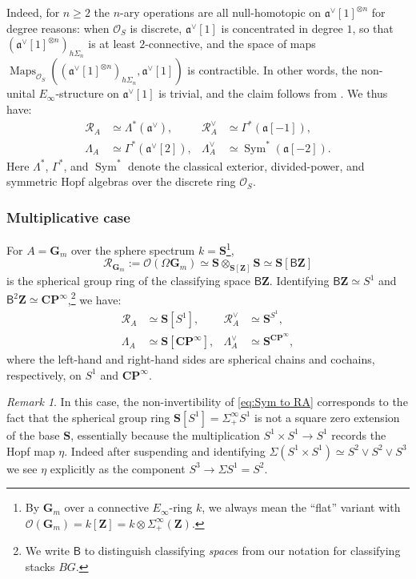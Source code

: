 \documentclass[12pt, oneside]{amsart}
\numberwithin{equation}{section}
\theoremstyle{remark}
\newtheorem{remark}[subsubsection]{Remark}
\theoremstyle{plain}
\renewcommand{\ge}{\geqslant}
\DeclareMathOperator{\Map}{Maps}
\newcommand{\R}{\mathcal{R}}
\newcommand{\RA}{\R_A}
\newcommand{\fra}{\mathfrak{a}}
\newcommand{\frav}{\mathfrak{a}^\vee}
\newcommand{\lam}{\Lambda}
\newcommand{\lamco}{\Lambda^\vee}
\newcommand{\OO}{\mathcal{O}}
\newcommand{\GGm}{\mathbf{G}_{m}}
\newcommand{\bZ}{\mathbf{Z}}
\DeclareMathOperator{\Sym}{Sym}
\begin{document}
Indeed, for $n \ge 2$ the $n$-ary operations are all null-homotopic on $\frav[1]^{\otimes n}$ for degree reasons: when $\OO_S$ is discrete, $\frav[1]$ is concentrated in degree $1$, so that $(\frav[1]^{\otimes n})_{h\Sigma_n}$ is at least $2$-connective, and the space of maps $\Map_{\OO_S}((\frav[1]^{\otimes n})_{h\Sigma_n}, \frav[1])$ is contractible.
In other words, the non-unital $E_\infty$-structure on $\frav[1]$ is trivial, and the claim follows from \cite[Prop.~5.4.4.10]{LurieHA}.
We thus have:
\begin{align*}
  \RA &\simeq \Lambda^*(\frav), & \RA^\vee &\simeq \Gamma^*(\fra[-1]), \\
  \lam_A &\simeq \Gamma^*(\frav[2]), & \lamco_A &\simeq \Sym^*(\fra[-2]).
\end{align*}
Here $\Lambda^*$, $\Gamma^*$, and $\Sym^*$ denote the classical exterior, divided-power, and symmetric Hopf algebras over the discrete ring $\OO_S$.

\subsubsection{Multiplicative case}\label{sssec:OO(Gm[-1])}

For $A = \GGm$ over the sphere spectrum $k=\mathbf{S}$\footnote{%
By $\GGm$ over a connective $E_\infty$-ring $k$, we always mean the ``flat'' variant with $\OO(\GGm) = k[\bZ] = k \otimes \Sigma^\infty_+(\bZ)$.
},
$$\R_{\GGm} := \OO(\Omega\GGm) \simeq \mathbf{S} \otimes_{\mathbf{S}[\bZ]} \mathbf{S} \simeq \mathbf{S}[\mathsf{B}\bZ]$$
is the spherical group ring of the classifying space $\mathsf{B}\bZ$.
Identifying $\mathsf{B}\mathbf{Z} \simeq S^1$ and $\mathsf{B}^2\mathbf{Z} \simeq \mathbf{C}\mathbf{P}^\infty$,\footnote{%
  We write $\mathsf{B}$ to distinguish classifying \emph{space}s from our notation for classifying stacks $BG$.
} we have:
\begin{align*}
  \RA &\simeq \mathbf{S}[S^1], & \RA^\vee &\simeq \mathbf{S}^{S^1}, \\
  \lam_A &\simeq \mathbf{S}[\mathbf{C}\mathbf{P}^\infty], & \lamco_A &\simeq \mathbf{S}^{\mathbf{C}\mathbf{P}^\infty},
\end{align*}
where the left-hand and right-hand sides are spherical chains and cochains, respectively, on $S^1$ and $\mathbf{C}\mathbf{P}^\infty$.

\begin{remark} \label{rem:Hopf map} In this case, the non-invertibility of \eqref{eq:Sym to RA} corresponds to the fact that the spherical group ring $\mathbf{S}[S^1]=\Sigma^\infty_+ S^1$ is not a square zero extension of the base $\mathbf{S}$, essentially because the multiplication $S^1\times S^1\to S^1$ records the Hopf map $\eta$. Indeed after suspending and identifying $\Sigma (S^1\times S^1)\simeq S^2\vee S^2\vee S^3$ we see $\eta$ explicitly as the component $S^3\to\Sigma S^1=S^2.$\end{remark}
\end{document}
